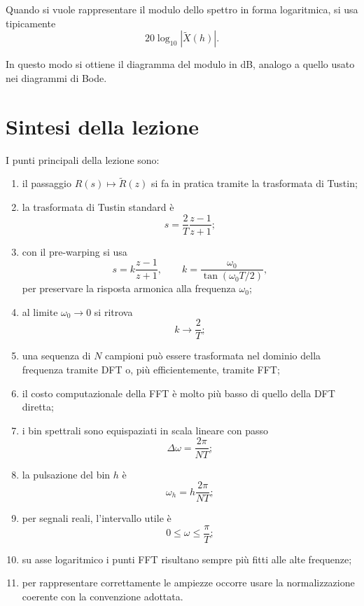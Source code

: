 Quando si vuole rappresentare il modulo dello spettro in forma logaritmica,
si usa tipicamente
\[
20\log_{10}|\tilde X(h)|.
\]

In questo modo si ottiene il diagramma del modulo in dB,
analogo a quello usato nei diagrammi di Bode.

\section{Sintesi della lezione}

I punti principali della lezione sono:
\begin{enumerate}
    \item il passaggio \(R(s)\mapsto \tilde R(z)\) si fa in pratica tramite la trasformata di Tustin;
    \item la trasformata di Tustin standard è
    \[
    s=\frac{2}{T}\frac{z-1}{z+1};
    \]
    \item con il pre-warping si usa
    \[
    s=k\frac{z-1}{z+1},
    \qquad
    k=\frac{\omega_0}{\tan(\omega_0 T/2)},
    \]
    per preservare la risposta armonica alla frequenza \(\omega_0\);
    \item al limite \(\omega_0\to 0\) si ritrova
    \[
    k\to \frac{2}{T};
    \]
    \item una sequenza di \(N\) campioni può essere trasformata nel dominio della frequenza
    tramite DFT o, più efficientemente, tramite FFT;
    \item il costo computazionale della FFT è molto più basso di quello della DFT diretta;
    \item i bin spettrali sono equispaziati in scala lineare con passo
    \[
    \Delta\omega=\frac{2\pi}{NT};
    \]
    \item la pulsazione del bin \(h\) è
    \[
    \omega_h=h\frac{2\pi}{NT};
    \]
    \item per segnali reali, l'intervallo utile è
    \[
    0\le \omega \le \frac{\pi}{T};
    \]
    \item su asse logaritmico i punti FFT risultano sempre più fitti alle alte frequenze;
    \item per rappresentare correttamente le ampiezze occorre usare la normalizzazione coerente
    con la convenzione adottata.
\end{enumerate}